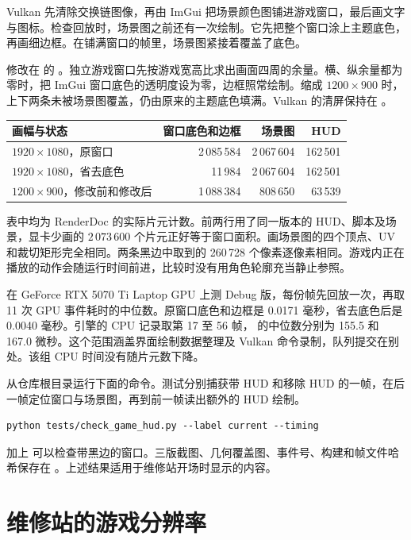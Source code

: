 Vulkan 先清除交换链图像，再由 ImGui 把场景颜色图铺进游戏窗口，最后画文字与图标。检查回放时，场景图之前还有一次绘制。它先把整个窗口涂上主题底色，再画细边框。在铺满窗口的帧里，场景图紧接着覆盖了底色。

修改在  的 。独立游戏窗口先按游戏宽高比求出画面四周的余量。横、纵余量都为零时，把 ImGui 窗口底色的透明度设为零，边框照常绘制。缩成 $1200\times900$ 时，上下两条未被场景图覆盖，仍由原来的主题底色填满。Vulkan 的清屏保持在 。

{\smalltable\noindent\begin{tabularx}{\linewidth}{@{}Xrrr@{}}\toprule
画幅与状态 & 窗口底色和边框 & 场景图 & HUD\\\midrule
$1920\times1080$，原窗口 & 2\,085\,584 & 2\,067\,604 & 162\,501\\
$1920\times1080$，省去底色 & 11\,984 & 2\,067\,604 & 162\,501\\
$1200\times900$，修改前和修改后 & 1\,088\,384 & 808\,650 & 63\,539\\\bottomrule
\end{tabularx}}

表中均为 RenderDoc 的实际片元计数。前两行用了同一版本的 HUD、脚本及场景，显卡少画的 $2\,073\,600$ 个片元正好等于窗口面积。画场景图的四个顶点、UV 和裁切矩形完全相同。两条黑边中取到的 260\,728 个像素逐像素相同。游戏内正在播放的动作会随运行时间前进，比较时没有用角色轮廓充当静止参照。

在 GeForce RTX 5070 Ti Laptop GPU 上测 Debug 版，每份帧先回放一次，再取 11 次 GPU 事件耗时的中位数。原窗口底色和边框是 0.0171 毫秒，省去底色后是 0.0040 毫秒。引擎的 CPU 记录取第 17 至 56 帧， 的中位数分别为 155.5 和 167.0 微秒。这个范围涵盖界面绘制数据整理及 Vulkan 命令录制，队列提交在别处。该组 CPU 时间没有随片元数下降。

从仓库根目录运行下面的命令。测试分别捕获带 HUD 和移除 HUD 的一帧，在后一帧定位窗口与场景图，再到前一帧读出额外的 HUD 绘制。

\begin{lstlisting}
python tests/check_game_hud.py --label current --timing
\end{lstlisting}

加上  可以检查带黑边的窗口。三版截图、几何覆盖图、事件号、构建和帧文件哈希保存在 。上述结果适用于维修站开场时显示的内容。

\clearpage
\section{维修站的游戏分辨率}

